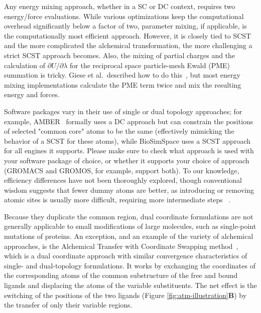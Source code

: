 \documentclass[9pt,bestpractices]{livecoms}
\begin{document}
Any energy mixing approach, whether in a SC or DC context, requires two energy/force evaluations. While various optimizations keep the computational overhead significantly below a factor of two,  parameter mixing, if applicable, is the computationally most efficient approach. However, it is closely tied to SCST and the more complicated the alchemical transformation, the more challenging a strict SCST approach becomes. Also, the mixing of partial charges and the calculation of $\partial U/\partial\lambda$ for the reciprocal space particle-mesh Ewald (PME) summation is tricky. Giese et al.\ described how to do this~\cite{Giese_2018}, but most energy mixing implementations calculate the PME term twice and mix the resulting energy and forces.

Software packages vary in their use of single or dual topology approaches; for example, AMBER~\cite{Case_JChemInfModel_2025_v65_p7835} formally uses a DC approach but can constrain the positions of selected "common core" atoms to be the same (effectively mimicking the behavior of a SCST for these atoms), while BioSimSpace uses a SCST approach for all engines it supports. Please make sure to check what approach is used with your software package of choice, or whether it supports your choice of approach (GROMACS and GROMOS, for example, support both). 
To our knowledge, efficiency differences have not been thoroughly explored, though conventional wisdom suggests that fewer dummy atoms are better, as introducing or removing atomic sites is usually more difficult, requiring more intermediate steps ~\cite{liu2013lead, mobley2012perspective}.

Because they duplicate the common region, dual coordinate formulations are not generally applicable to small modifications of large molecules, such as single-point mutations of proteins. An exception, and an example of the variety of alchemical approaches, is the Alchemical Transfer with Coordinate Swapping method~\cite{gallicchio2025mutants}, which is a dual coordinate approach with similar convergence characteristics of single- and dual-topology formulations. It works by exchanging the coordinates of the corresponding atoms of the common substructure of the free and bound ligands and displacing the atoms of the variable substituents. The net effect is the switching of the positions of the two ligands (Figure \ref{fig:atm-illustration}\textbf{B}) by the transfer of only their variable regions.
\end{document}
